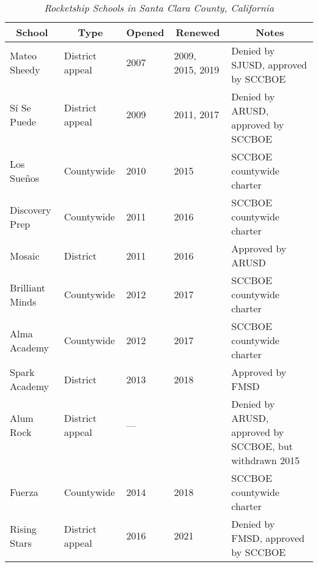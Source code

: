 \begin{table}[ht]
  \caption[Rocketship Schools in Santa Clara County, California]{\textit{Rocketship Schools in Santa Clara County, California}}%
  \label{tab:RocketshipSchools}\SingleSpacing\small
  \begin{tabular}{lllll}\toprule
    \multicolumn{1}{c}{School}  & \multicolumn{1}{c}{Type}    & \multicolumn{1}{c}{Opened}  & \multicolumn{1}{c}{Renewed} & \multicolumn{1}{c}{Notes}                \\
    \midrule
    Mateo Sheedy    & District appeal & 2007            & 2009, 2015, 2019 & \multirow[t]{2}{1.5in}{Denied by SJUSD, approved by SCCBOE}\\\\
    Sí Se Puede     & District appeal & 2009            & 2011, 2017       & \multirow[t]{2}{1.5in}{Denied by ARUSD, approved by SCCBOE}\\\\
    Los Sueños      & Countywide      & 2010            & 2015             & SCCBOE countywide charter\\
    Discovery Prep  & Countywide      & 2011            & 2016             & SCCBOE countywide charter\\
    Mosaic          & District        & 2011            & 2016             & Approved by ARUSD\\
    Brilliant Minds & Countywide      & 2012            & 2017             & SCCBOE countywide charter\\
    Alma Academy    & Countywide      & 2012            & 2017             & SCCBOE countywide charter\\
    Spark Academy   & District        & 2013            & 2018             & Approved by FMSD\\
    Alum Rock       & District appeal & —               &                  & \multirow[t]{3}{1,5in}{Denied by ARUSD, approved by SCCBOE, but withdrawn 2015}\\\\\\
    Fuerza          & Countywide      & 2014            & 2018             & SCCBOE countywide charter\\
    Rising Stars    & District appeal & 2016            & 2021             & \multirow[t]{3}{1.5in}{Denied by FMSD, approved by SCCBOE}\\\\\bottomrule
  \end{tabular}
\end{table}


